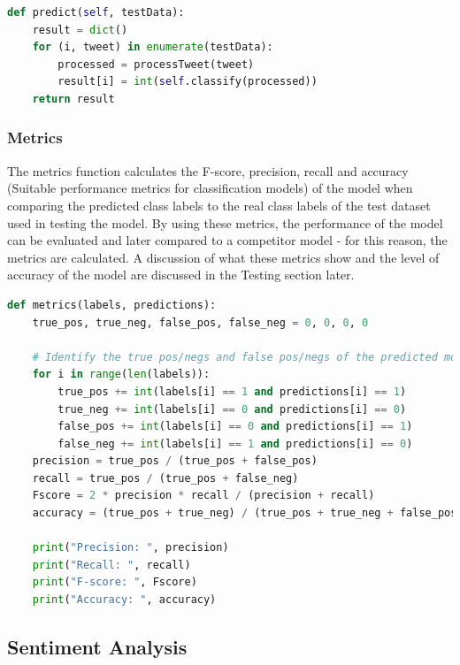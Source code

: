 \documentclass[oneside, 12pt]{article}
\begin{document}
		\begin{lstlisting}[language=python, caption=Predict function of parent classifier class of spam\_filter.py]
def predict(self, testData):
	result = dict()
	for (i, tweet) in enumerate(testData):
		processed = processTweet(tweet)
		result[i] = int(self.classify(processed))
	return result
		\end{lstlisting}
		
		\subsubsection{Metrics}
		
		The metrics function calculates the F-score, precision, recall and accuracy (Suitable performance metrics for classification models) of the model when comparing the predicted class labels to the real class labels of the test dataset used in testing the model. By using these metrics, the performance of the model can be evaluated and later compared to a competitor model - for this reason, the metrics are calculated. A discussion of what these metrics show and the level of accuracy of the model are  discussed in the Testing section later.
		
		\begin{lstlisting}[language=python, caption=Metrics function for calculating the performance and accuracy of the model]
def metrics(labels, predictions):
	true_pos, true_neg, false_pos, false_neg = 0, 0, 0, 0
	
	# Identify the true pos/negs and false pos/negs of the predicted model of predicted values compared to the actual true values of the test dataset class labels
	for i in range(len(labels)):
		true_pos += int(labels[i] == 1 and predictions[i] == 1)
		true_neg += int(labels[i] == 0 and predictions[i] == 0)
		false_pos += int(labels[i] == 0 and predictions[i] == 1)
		false_neg += int(labels[i] == 1 and predictions[i] == 0)
	precision = true_pos / (true_pos + false_pos)
	recall = true_pos / (true_pos + false_neg)
	Fscore = 2 * precision * recall / (precision + recall)
	accuracy = (true_pos + true_neg) / (true_pos + true_neg + false_pos + false_neg)

	print("Precision: ", precision)
	print("Recall: ", recall)
	print("F-score: ", Fscore)
	print("Accuracy: ", accuracy)
		\end{lstlisting}
		
		\newpage
		
		\subsection{Sentiment Analysis}
		
\end{document}
